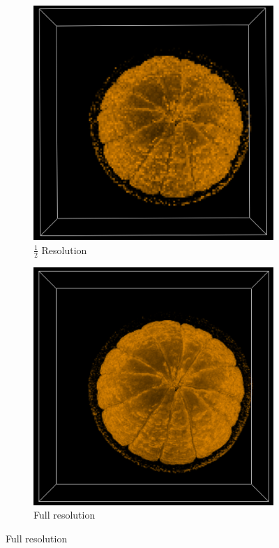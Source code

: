\documentclass[a4paper,twoside,11pt]{article}
\begin{document}
\begin{figure}[h!]
\begin{center}
\begin{subfigure}[b]{0.3\textwidth}
                \includegraphics[width=\textwidth]{Images/res2.png}
                \caption{$\frac{1}{2}$ Resolution}
                \label{fig:res2}
        \end{subfigure}
        \begin{subfigure}[b]{0.3\textwidth}
                \includegraphics[width=\textwidth]{Images/res1.png}
                \caption{Full resolution}
                \label{fig:res1}
        \end{subfigure}
\end{center}
\end{figure}
\newpage
\end{document}
